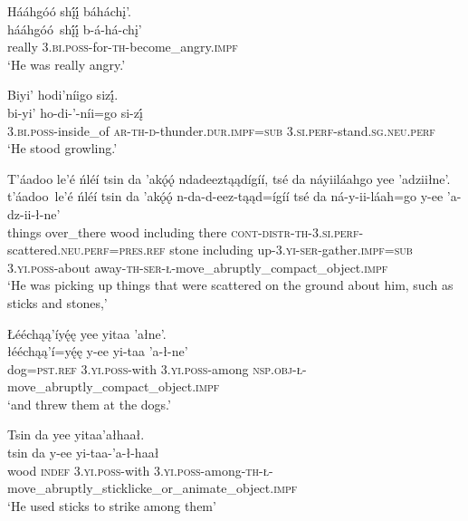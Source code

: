 \ea\label{ex:text6-5-8}
Hááhgóó shį́į́ báháchį’.\\
\gll hááhgóó~{shį́į́}	b-á-há-chį’\\
     really	3.\textsc{bi}.\textsc{poss}-for-\textsc{th}-become\_angry.\textsc{impf}\\
\glt `He was really angry.'
\z

\ea\label{ex:text6-5-9}
Biyi’ hodi’níigo sizį́.\\
\gll bi-yi’	ho-di-’-níi=go	si-zį́\\
     3.\textsc{bi}.\textsc{poss}-inside\_of	\textsc{ar}-\textsc{th}-\textsc{d}-thunder.\textsc{dur}.\textsc{impf}=\textsc{sub}	3.\textsc{si}.\textsc{perf}-stand.\textsc{sg}.\textsc{neu}.\textsc{perf}\\
\glt `He stood growling.'
\z

\ea\label{ex:text6-5-10}
T’áadoo le’é ńléí tsin da ’akǫ́ǫ́ ndadeeztąądígíí, tsé da náyiiláahgo yee ’adziiłne’.\\
\gll t’áadoo~{le’é}	ńléí	tsin	da	’akǫ́ǫ́	n-da-d-eez-tąąd=ígíí	tsé	da	ná-y-ii-láah=go	y-ee	’a-dz-ii-ł-ne’\\
     things	over\_there	wood	including	there	\textsc{cont}-\textsc{distr}-\textsc{th}-3.\textsc{si}.\textsc{perf}-scattered.\textsc{neu}.\textsc{perf}=\textsc{pres}.\textsc{ref}	stone	including	up-3.\textsc{yi}-\textsc{ser}-gather.\textsc{impf}=\textsc{sub}	3.\textsc{yi}.\textsc{poss}-about	away-\textsc{th}-\textsc{ser}-\textsc{ł}-move\_abruptly\_compact\_object.\textsc{impf}\\
\glt `He was picking up things that were scattered on the ground about him, such as sticks and stones,'
\z

\ea\label{ex:text6-5-11}
Łééchąą’íyę́ę yee yitaa ’ałne’.\\
\gll łééchąą’í=yę́ę	y-ee	yi-taa	’a-ł-ne’\\
     dog=\textsc{pst}.\textsc{ref}	3.\textsc{yi}.\textsc{poss}-with	3.\textsc{yi}.\textsc{poss}-among	\textsc{nsp}.\textsc{obj}-\textsc{ł}-move\_abruptly\_compact\_object.\textsc{impf}\\
\glt `and threw them at the dogs.'
\z

\ea\label{ex:text6-5-12}
Tsin da yee yitaa’ałhaał.\\
\gll tsin	da	y-ee	yi-taa-’a-ł-haał\\
     wood	\textsc{indef}	3.\textsc{yi}.\textsc{poss}-with	3.\textsc{yi}.\textsc{poss}-among-\textsc{th}-\textsc{ł}-move\_abruptly\_sticklicke\_or\_animate\_object.\textsc{impf}\\
\glt `He used sticks to strike among them'
\z

